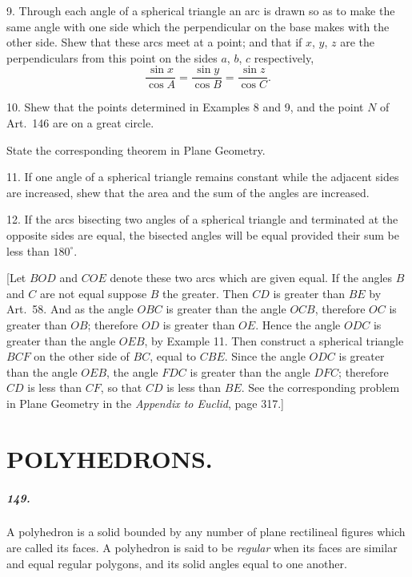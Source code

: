 \documentclass{book}[2004/02/16]
\begin{document}
\begin{mainmatter}
\begin{spacing}{1.3}
9. Through each angle of a spherical triangle an arc is drawn
so as to make the same angle with one side which the perpendicular
on the base makes with the other side. Shew that these
arcs meet at a point; and that if $x$, $y$, $z$ are the perpendiculars
from this point on the sides $a$, $b$, $c$ respectively,
\[
\frac{\sin x}{\cos A}=\frac{\sin y}{\cos B}=\frac{\sin z}{\cos C}.
\]

10. Shew that the points determined in Examples 8 and 9,
and the point $N$ of Art.\ 146 are on a great circle.

State the corresponding theorem in Plane Geometry.
\medskip

11. If one angle of a spherical triangle remains constant while
the adjacent sides are increased, shew that the area and the sum
of the angles are increased.
\medskip

12. If the arcs bisecting two angles of a spherical triangle and
terminated at the opposite sides are equal, the bisected angles will
be equal provided their sum be less than $180^\circ$.

[Let $BOD$ and $COE$ denote these two arcs which are given
equal. If the angles $B$ and $C$ are not equal suppose $B$ the greater.
Then $CD$ is greater than $BE$ by Art.\ 58. And as the angle $OBC$
is greater than the angle $OCB$, therefore $OC$ is greater than $OB$;
therefore $OD$ is greater than $OE$. Hence the angle $ODC$ is
greater than the angle $OEB$, by Example 11. Then construct
a spherical triangle $BCF$ on the other side of $BC$, equal to $CBE$.
Since the angle $ODC$ is greater than the angle $OEB$, the angle
$FDC$ is greater than the angle $DFC$; therefore $CD$ is less than
$CF$, so that $CD$ is less than $BE$. See the corresponding problem
in Plane Geometry in the \textit{Appendix to Euclid}, page 317.]

\chapter[Polyhedrons.]{POLYHEDRONS.}

\paragraph{149.} A polyhedron is a solid bounded by any number of
plane rectilineal figures which are called its faces. A polyhedron
is said to be \textit{regular} when its faces are similar and equal regular
polygons, and its solid angles equal to one another.


\end{spacing}
\end{mainmatter}
\end{document}
